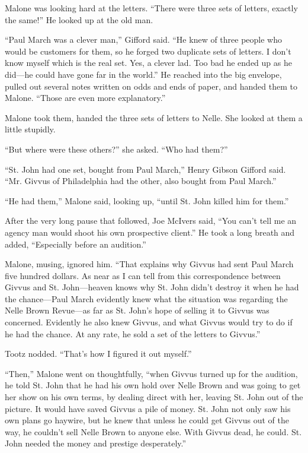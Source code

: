 \documentclass{novel}
\begin{document}
Malone was looking hard at the letters. “There were three sets of letters, exactly the same!” He looked up at the old man.

“Paul March was a clever man,” Gifford said. “He knew of three people who would be customers for them, so he forged two duplicate sets of letters. I don’t know myself which is the real set. Yes, a clever lad. Too bad he ended up as he did—he could have gone far in the world.” He reached into the big envelope, pulled out several notes written on odds and ends of paper, and handed them to Malone. “Those are even more explanatory.”

Malone took them, handed the three sets of letters to Nelle. She looked at them a little stupidly.

“But where were these others?” she asked. “Who had them?”

“St. John had one set, bought from Paul March,” Henry Gibson Gifford said. “Mr. Givvus of Philadelphia had the other, also bought from Paul March.”

“He had them,” Malone said, looking up, “until St. John killed him for them.”

After the very long pause that followed, Joe McIvers said, “You can’t tell me an agency man would shoot his own prospective client.” He took a long breath and added, “Especially before an audition.”

Malone, musing, ignored him. “That explains why Givvus had sent Paul March five hundred dollars. As near as I can tell from this correspondence between Givvus and St. John—heaven knows why St. John didn’t destroy it when he had the chance—Paul March evidently knew what the situation was regarding the Nelle Brown Revue—as far as St. John’s hope of selling it to Givvus was concerned. Evidently he also knew Givvus, and what Givvus would try to do if he had the chance. At any rate, he sold a set of the letters to Givvus.”

Tootz nodded. “That’s how I figured it out myself.”

“Then,” Malone went on thoughtfully, “when Givvus turned up for the audition, he told St. John that he had his own hold over Nelle Brown and was going to get her show on his own terms, by dealing direct with her, leaving St. John out of the picture. It would have saved Givvus a pile of money. St. John not only saw his own plans go haywire, but he knew that unless he could get Givvus out of the way, he couldn’t sell Nelle Brown to anyone else. With Givvus dead, he could. St. John needed the money and prestige desperately.”
\end{document}
